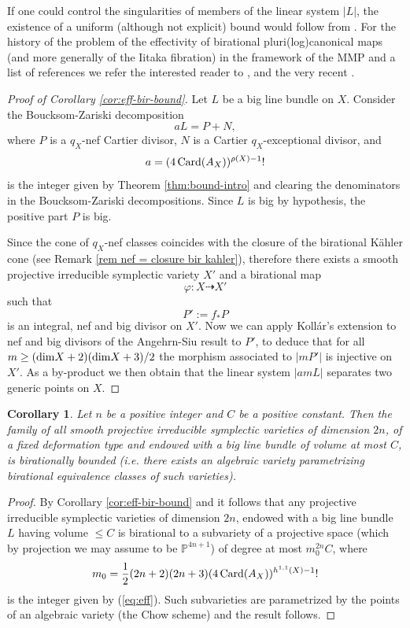 \documentclass[12pt,reqno]{amsart}
\def\phi{\varphi}
\def\Card{\mathop{\rm Card}\nolimits}
\newtheorem{cor}[thm]{Corollary}
\theoremstyle{plain}
\theoremstyle{definition}
\begin{document}
If one could control the singularities of members of the linear system $|L|$, the existence of a uniform (although not explicit) bound would follow from \cite[Theorem 1.3]{HMX}. For the history of the problem of the effectivity of birational pluri(log)canonical maps (and more generally of the Iitaka fibration) in the framework of the MMP and a list of references we refer the interested reader to \cite{HMX}, \cite{BZ} and the very recent \cite{Bi}.
\begin{proof}[Proof of Corollary \ref{cor:eff-bir-bound}]

Let $L$ be a big line bundle on $X$. 
Consider the Boucksom-Zariski decomposition 
$$
a L = P + N,
$$
where $P$ is a $q_{X}$-nef Cartier divisor, $N$ is a Cartier $q_X$-exceptional divisor, and 
$$ 
a  = (4\Card(A_X))^{\rho(X)-1} !
$$
is the integer given by Theorem \ref{thm:bound-intro} and clearing the denominators in the Boucksom-Zariski decompositions.
Since $L$ is big by hypothesis, the positive part $P$ is big. 

Since the cone of $q_X$-nef classes coincides with the closure of the birational K\"ahler cone (see Remark \ref{rem nef = closure bir kahler}), therefore there exists a smooth projective irreducible symplectic variety $X'$ and a birational map
$$
\phi :X\dashrightarrow X'
$$
such that 
$$
P':= f_* P
$$
is an integral, nef and big divisor on $X'$.  
Now we can apply Koll\'ar's extension \cite[Theorem 5.9]{Kol} to nef and big divisors of the Angehrn-Siu result to $P'$, 
to deduce that 
for all $m\geq ({\rm dim} X +2)({\rm dim} X+3)/2$
the morphism associated to $|mP'|$ is injective on $X'$.
As a by-product we then obtain that the linear system $|amL|$
separates two generic points on $X$.
\end{proof}


\begin{cor}\label{cor:bir-bound}
Let $n$ be a positive integer and $C$ be a positive constant.
Then the family of all smooth projective irreducible symplectic varieties of dimension
$2n$, of a fixed deformation type and endowed with a big line bundle of volume at most $C$, is birationally bounded (i.e. there exists an algebraic variety parametrizing birational equivalence classes of such varieties).
\end{cor}
\begin{proof}
By Corollary \ref{cor:eff-bir-bound} and \cite[Lemma 2.2]{HM} it follows that any projective irreducible symplectic varieties of dimension
$2n$, endowed with a big  line bundle $L$ having volume $\leq C$ is birational to a subvariety of a
projective space (which by projection we may assume to be $\mathbb P^{4n+1}$) of degree at most $m_0^{2n}C$, where 
$$
m_0=\frac{1}{2}(2n+2)(2n+3)(4\Card(A_X))^{h^{1,1}(X)-1} !
$$ 
is the integer given by (\ref{eq:eff}). 
Such subvarieties are parametrized by the points of an algebraic variety (the Chow scheme) and the result follows.
\end{proof}
\end{document}

